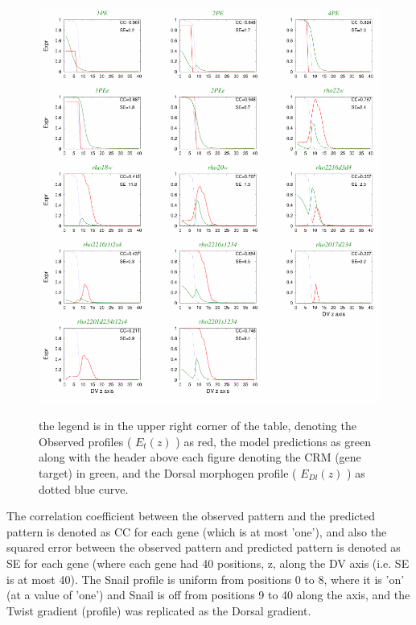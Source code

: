\begin{figure}
  \includegraphics[width=1\textwidth]{DIb.pdf}\\
  \caption{the legend is in the upper right corner of the table, denoting the Observed profiles ( $E_t(z)$ ) as red, the model predictions as green along with the header above each figure denoting the CRM (gene target) in green, and the Dorsal morphogen profile  ( $E_{Dl}(z)$ ) as dotted blue curve. }\label{roughfit}
\end{figure}
  The correlation coefficient between the observed pattern and the predicted pattern is denoted as CC for each gene (which is at most 'one'), and also the squared error between the observed pattern and predicted pattern is denoted as SE for each gene (where each gene had 40 positions, z, along the DV axis (i.e. SE is at most 40).  The Snail profile is uniform from positions 0 to 8, where it is 'on' (at a value of 'one') and Snail is off from positions 9 to 40 along the axis, and the Twist gradient (profile) was replicated as the Dorsal gradient.
\newpage

